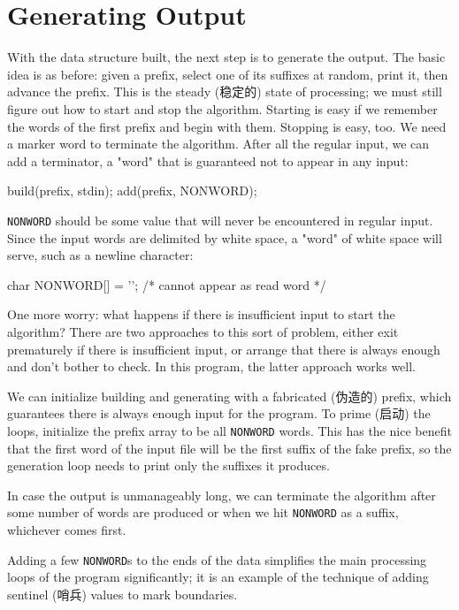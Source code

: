 \section{Generating Output}
\label{sec:generating_output}

With the data structure built, the next step is to generate the output. The
basic idea is as before: given a prefix, select one of its suffixes at
random, print it, then advance the prefix. This is the steady (稳定的)
state of processing; we must still figure out how to start and stop the
algorithm. Starting is easy if we remember the words of the first prefix
and begin with them. Stopping is easy, too. We need a marker word to
terminate the algorithm. After all the regular input, we can add a
terminator, a "word" that is guaranteed not to appear in any input:
\begin{wellcode}
    build(prefix, stdin);
    add(prefix, NONWORD);
\end{wellcode}
\verb'NONWORD' should be some value that will never be encountered in
regular input. Since the input words are delimited by white space, a "word"
of white space will serve, such as a newline character:
\begin{wellcode}
    char    NONWORD[] = '\n';   /* cannot appear as read word */
\end{wellcode}

One more worry: what happens if there is insufficient input to start the
algorithm?  There are two approaches to this sort of problem, either exit
prematurely if there is insufficient input, or arrange that there is always
enough and don't bother to check.  In this program, the latter approach
works well.

We can initialize building and generating with a fabricated (伪造的)
prefix, which guarantees there is always enough input for the program. To
prime (启动) the loops, initialize the prefix array to be all
\verb'NONWORD' words. This has the nice benefit that the first word of the
input file will be the first suffix of the fake prefix, so the generation
loop needs to print only the suffixes it produces.

In case the output is unmanageably long, we can terminate the algorithm
after some number of words are produced or when we hit \verb'NONWORD' as a
suffix, whichever comes first.

Adding a few \verb'NONWORD's to the ends of the data simplifies the main
processing loops of the program significantly; it is an example of the
technique of adding sentinel (哨兵) values to mark boundaries.

